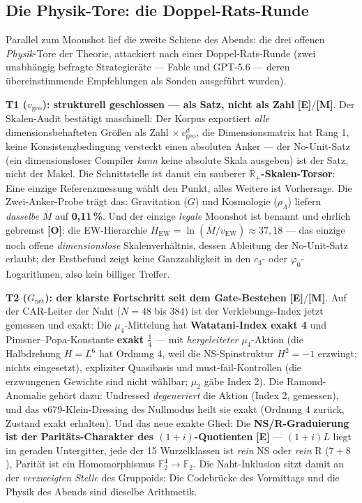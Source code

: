 \documentclass[11pt,a4paper]{article}
\newcommand{\E}{\textcolor{gut}{\textbf{[E]}}}
\newcommand{\OO}{\textcolor{offen}{\textbf{[O]}}}
\newcommand{\M}{\textcolor{mess}{\textbf{[M]}}}
\begin{document}
\subsection*{Die Physik-Tore: die Doppel-Rats-Runde}

Parallel zum Moonshot lief die zweite Schiene des Abends: die drei
offenen \emph{Physik}-Tore der Theorie, attackiert nach einer
Doppel-Rats-Runde (zwei unabhängig befragte Strategieräte ---
Fable und GPT-5.6 --- deren übereinstimmende Empfehlungen als
Sonden ausgeführt wurden).

\textbf{T1 ($v_{\mathrm{geo}}$): strukturell geschlossen --- als
Satz, nicht als Zahl} \E{}/\M{}. Der Skalen-Audit bestätigt
maschinell: Der Korpus exportiert \emph{alle} dimensionsbehafteten
Größen als Zahl $\times\, v_{\mathrm{geo}}^{d}$, die
Dimensionsmatrix hat Rang 1, keine Konsistenzbedingung versteckt
einen absoluten Anker --- der No-Unit-Satz (ein dimensionsloser
Compiler \emph{kann} keine absolute Skala ausgeben) ist der Satz,
nicht der Makel. Die Schnittstelle ist damit ein sauberer
\textbf{$\mathbb{R}_+$-Skalen-Torsor}: Eine einzige Referenzmessung
wählt den Punkt, alles Weitere ist Vorhersage. Die
Zwei-Anker-Probe trägt das: Gravitation ($G$) und Kosmologie
($\rho_\Lambda$) liefern \emph{dasselbe} $\bar M$ auf
\textbf{0{,}11\,\%}. Und der einzige \emph{legale} Moonshot ist
benannt und ehrlich gebremst \OO{}: die EW-Hierarchie
$H_{\mathrm{EW}} = \ln(\bar M/v_{\mathrm{EW}}) \approx 37{,}18$ ---
das einzige noch offene \emph{dimensionslose} Skalenverhältnis,
dessen Ableitung der No-Unit-Satz erlaubt; der Erstbefund zeigt
keine Ganzzahligkeit in den $c_3$- oder $\varphi_0$-Logarithmen,
also kein billiger Treffer.

\textbf{T2 ($G_{\mathrm{net}}$): der klarste Fortschritt seit dem
Gate-Bestehen} \E{}/\M{}. Auf der CAR-Leiter der Naht ($N = 48$ bis
$384$) ist der Verklebungs-Index jetzt gemessen und exakt: Die
$\mu_4$-Mittelung hat \textbf{Watatani-Index exakt 4} und
Pimsner--Popa-Konstante \textbf{exakt $\tfrac14$} --- mit
\emph{hergeleiteter} $\mu_4$-Aktion (die Halbdrehung $H = L^6$ hat
Ordnung 4, weil die NS-Spinstruktur $H^2 = -1$ erzwingt; nichts
eingesetzt), expliziter Quasibasis und must-fail-Kontrollen (die
erzwungenen Gewichte sind nicht wählbar; $\mu_2$ gäbe Index 2). Die
Ramond-Anomalie gehört dazu: Undressed \emph{degeneriert} die
Aktion (Index 2, gemessen), und das v679-Klein-Dressing des
Nullmodus heilt sie exakt (Ordnung 4 zurück, Zustand exakt
erhalten). Und das neue exakte Glied: Die
\textbf{NS/R-Graduierung ist der Paritäts-Charakter des
$(1+i)$-Quotienten} \E{} --- $(1+i)L$ liegt im geraden Untergitter,
jede der 15 Wurzelklassen ist \emph{rein} NS oder \emph{rein} R
($7 + 8$), Parität ist ein Homomorphismus $\mathbb{F}_2^4 \to
\mathbb{F}_2$. Die Naht-Inklusion sitzt damit an der
\emph{verzweigten Stelle} des Gruppoids: Die Codebrücke des
Vormittags und die Physik des Abends sind dieselbe Arithmetik.
\end{document}
